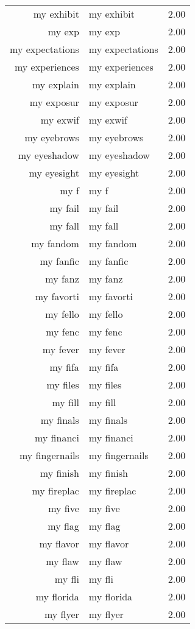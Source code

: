 \begin{table}[ht]
\begin{tabular}{rlr}
  my exhibit & my exhibit & 2.00 \\ 
  my exp & my exp & 2.00 \\ 
  my expectations & my expectations & 2.00 \\ 
  my experiences & my experiences & 2.00 \\ 
  my explain & my explain & 2.00 \\ 
  my exposur & my exposur & 2.00 \\ 
  my exwif & my exwif & 2.00 \\ 
  my eyebrows & my eyebrows & 2.00 \\ 
  my eyeshadow & my eyeshadow & 2.00 \\ 
  my eyesight & my eyesight & 2.00 \\ 
  my f & my f & 2.00 \\ 
  my fail & my fail & 2.00 \\ 
  my fall & my fall & 2.00 \\ 
  my fandom & my fandom & 2.00 \\ 
  my fanfic & my fanfic & 2.00 \\ 
  my fanz & my fanz & 2.00 \\ 
  my favorti & my favorti & 2.00 \\ 
  my fello & my fello & 2.00 \\ 
  my fenc & my fenc & 2.00 \\ 
  my fever & my fever & 2.00 \\ 
  my fifa & my fifa & 2.00 \\ 
  my files & my files & 2.00 \\ 
  my fill & my fill & 2.00 \\ 
  my finals & my finals & 2.00 \\ 
  my financi & my financi & 2.00 \\ 
  my fingernails & my fingernails & 2.00 \\ 
  my finish & my finish & 2.00 \\ 
  my fireplac & my fireplac & 2.00 \\ 
  my five & my five & 2.00 \\ 
  my flag & my flag & 2.00 \\ 
  my flavor & my flavor & 2.00 \\ 
  my flaw & my flaw & 2.00 \\ 
  my fli & my fli & 2.00 \\ 
  my florida & my florida & 2.00 \\ 
  my flyer & my flyer & 2.00 \\ 

\end{tabular}
\end{table}
